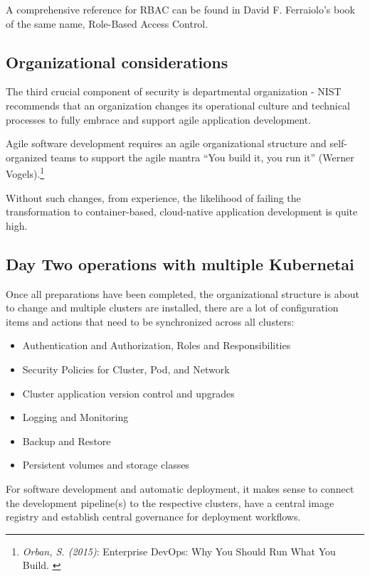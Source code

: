 A comprehensive reference for RBAC can be found in David F. Ferraiolo's book of the same name, Role-Based Access Control\cite{rbac}.

\subsection{Organizational considerations}

The third crucial component of security is departmental organization - NIST recommends that an organization changes its operational culture and technical processes to fully embrace and support agile application development.

Agile software development requires an agile organizational structure and self-organized teams to support the agile mantra “You build it, you run it” (Werner Vogels).\footnote{\textit{Orban, S. (2015)}: Enterprise DevOps: Why You Should Run What You Build. \cite{devOps}}

Without such changes, from experience, the likelihood of failing the transformation to container-based, cloud-native application development is quite high.

\subsection{Day Two operations with multiple Kubernetai}

Once all preparations have been completed, the organizational structure is about to change and multiple clusters are installed, there are a lot of configuration items and actions that need to be synchronized across all clusters:

\begin{itemize}
\item Authentication and Authorization, Roles and Responsibilities
\item Security Policies for Cluster, Pod, and Network
\item Cluster application version control and upgrades
\item Logging and Monitoring
\item Backup and Restore
\item Persistent volumes and storage classes
\end{itemize}

For software development and automatic deployment, it makes sense to connect the development pipeline(s) to the respective clusters, have a central image registry and establish central governance for deployment workflows.

